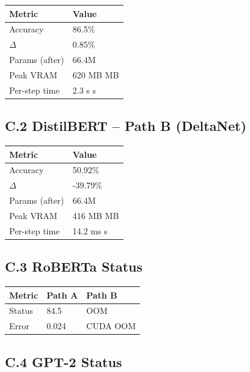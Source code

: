 \begin{table}[H]
\centering
\small
\begin{tabular}{ll}
\toprule
\textbf{Metric} & \textbf{Value} \\
\midrule
Accuracy & 86.5\% \\
$\Delta$ & 0.85\% \\
Params (after) & 66.4M \\
Peak VRAM & 620 MB MB \\
Per-step time & 2.3 s s \\
\bottomrule
\end{tabular}
\end{table}

\subsection{C.2 DistilBERT -- Path B (DeltaNet)}

\begin{table}[H]
\centering
\small
\begin{tabular}{ll}
\toprule
\textbf{Metric} & \textbf{Value} \\
\midrule
Accuracy & 50.92\% \\
$\Delta$ & -39.79\% \\
Params (after) & 66.4M \\
Peak VRAM & 416 MB MB \\
Per-step time & 14.2 ms s \\
\bottomrule
\end{tabular}
\end{table}

\subsection{C.3 RoBERTa Status}

\begin{table}[H]
\centering
\small
\begin{tabular}{lll}
\toprule
\textbf{Metric} & \textbf{Path A} & \textbf{Path B} \\
\midrule
Status & 84.5 & OOM \\
Error & 0.024 & CUDA OOM \\
\bottomrule
\end{tabular}
\end{table}

\subsection{C.4 GPT-2 Status}

